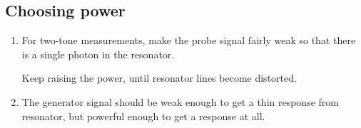 \subsection{Choosing power}
\label{sec:choosing-power}

\begin{enumerate}
\item  For two-tone  measurements,  make  the probe  signal
   fairly  weak so  that there  is a  single
  photon in the resonator.

  Keep  raising the  power,  until  resonator lines  become
  distorted.

\item The  generator signal   should  be weak
  enough  to  get  a  thin  response  from  resonator,  but
  powerful enough to get a response at all.
\end{enumerate}

\newpage